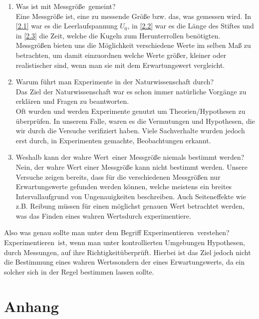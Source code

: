 \documentclass[11pt,a4paper,titlepage, ngerman]{article}
\begin{document}
		\begin{enumerate}
			\item Was ist mit \glqq Messgröße\grqq\ gemeint? \\ 
			
				Eine Messgröße ist, eine zu messende Größe bzw. das, was gemessen wird. In \ref{2.1} war es die Leerlaufspannung $U_0$, in \ref{2.2} war es die Länge des Stiftes und in \ref{2.3} die Zeit, welche die Kugeln zum Herunterrollen benötigten. Messgrößen bieten uns die Möglichkeit verschiedene Werte im selben Maß zu betrachten, um damit einzuordnen welche Werte größer, kleiner oder realistischer sind, wenn man sie mit dem Erwartungswert vergleicht. \\
				
			\item Warum führt man Experimente in der Naturwissenschaft durch? \\
			
				Das Ziel der Naturwissenschaft war es schon immer natürliche Vorgänge zu erklären und Fragen zu beantworten. \\ Oft wurden und werden Experimente genutzt um Theorien/Hypothesen zu überprüfen. In unserem Falle, waren es die Vermutungen und Hypothesen, die wir durch die Versuche verifiziert haben.
				Viele Sachverhalte wurden jedoch erst durch, in Experimenten gemachte, Beobachtungen erkannt. \\
				 
			\item Weshalb kann der \glqq wahre Wert\grqq\ einer Messgröße niemals bestimmt werden? \\
				
				Nein, der wahre Wert einer Messgröße kann nicht bestimmt werden. Unsere Versuche zeigen bereits, dass für die verschiedenen Messgrößen nur Erwartungswerte gefunden werden können, welche meistens ein \glqq breites Intervall\grqq aufgrund von Ungenauigkeiten beschreiben. %
				Auch Seiteneffekte wie z.B. Reibung müssen für einen möglichst genauen Wert betrachtet werden, was das Finden eines \glqq wahren Werts\grqq durch experimentiere. \\
				
		\end{enumerate}
		
		Also was genau sollte man unter dem Begriff \glqq Experimentieren\grqq\ verstehen? \\
		
		\glqq Experimentieren\grqq\ ist, wenn man unter kontrollierten Umgebungen Hypothesen, durch Messungen, auf ihre \glqq Richtigkeit\grqq überprüft. Hierbei ist das Ziel jedoch nicht die Bestimmung eines \glqq wahren Werts\grqq sondern der eines Erwartungswerts, da ein solcher sich in der Regel bestimmen lassen sollte.
		
	\section{Anhang}
		\label{Anhang}
\end{document}
